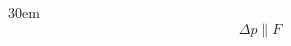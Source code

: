 \documentclass[border=4pt]{standalone}
\begin{document}
\begin{varwidth}{30em}
\large
\[ \Delta p \parallel F \]

\end{varwidth}
\end{document}
